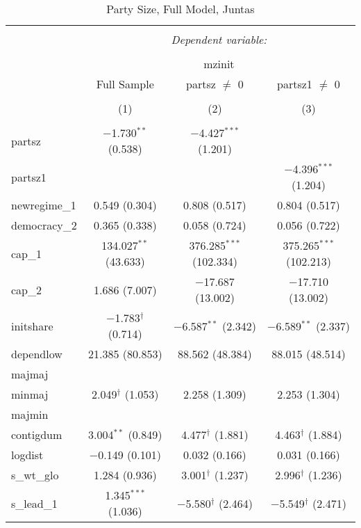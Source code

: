 
\begin{table}[!htbp] \centering 
  \caption{Party Size, Full Model, Juntas} 
  \label{} 
\begin{tabular}{@{\extracolsep{5pt}}lccc} 
\\[-1.8ex]\hline 
\hline \\[-1.8ex] 
 & \multicolumn{3}{c}{\textit{Dependent variable:}} \\ 
\cline{2-4} 
\\[-1.8ex] & \multicolumn{3}{c}{mzinit} \\ 
 & Full Sample & partsz $\neq$ 0 & partsz1 $\neq$ 0 \\ 
\\[-1.8ex] & (1) & (2) & (3)\\ 
\hline \\[-1.8ex] 
 partsz & $-$1.730$^{**}$ (0.538) & $-$4.427$^{***}$ (1.201) &  \\ 
  partsz1 &  &  & $-$4.396$^{***}$ (1.204) \\ 
  newregime\_1 & 0.549 (0.304) & 0.808 (0.517) & 0.804 (0.517) \\ 
  democracy\_2 & 0.365 (0.338) & 0.058 (0.724) & 0.056 (0.722) \\ 
  cap\_1 & 134.027$^{**}$ (43.633) & 376.285$^{***}$ (102.334) & 375.265$^{***}$ (102.213) \\ 
  cap\_2 & 1.686 (7.007) & $-$17.687 (13.002) & $-$17.710 (13.002) \\ 
  initshare & $-$1.783$^{\dagger}$ (0.714) & $-$6.587$^{**}$ (2.342) & $-$6.589$^{**}$ (2.337) \\ 
  dependlow & 21.385 (80.853) & 88.562 (48.384) & 88.015 (48.514) \\ 
  majmaj &  &  &  \\ 
  minmaj & 2.049$^{\dagger}$ (1.053) & 2.258 (1.309) & 2.253 (1.304) \\ 
  majmin &  &  &  \\ 
  contigdum & 3.004$^{**}$ (0.849) & 4.477$^{\dagger}$ (1.881) & 4.463$^{\dagger}$ (1.884) \\ 
  logdist & $-$0.149 (0.101) & 0.032 (0.166) & 0.031 (0.166) \\ 
  s\_wt\_glo & 1.284 (0.936) & 3.001$^{\dagger}$ (1.237) & 2.996$^{\dagger}$ (1.236) \\ 
  s\_lead\_1 & 1.345$^{***}$ (1.036) & $-$5.580$^{\dagger}$ (2.464) & $-$5.549$^{\dagger}$ (2.471) \\ 

\end{tabular}
\end{table}

